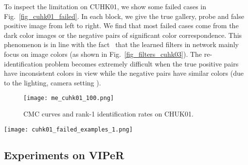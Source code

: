 \documentclass[10pt,twocolumn,letterpaper]{article}
\begin{document}
To inspect the limitation on CUHK01, we show some failed cases in Fig.~\ref{fig_cuhk01_failed}. In each block, we give the true gallery, probe and false positive image from left to right.
We find that most failed cases come from the dark color images or the negative pairs of significant color correspondence.
This phenomenon is in line with the fact~\cite{ahmed2015improved} that the learned filters in network mainly focus on image colors (as shown in Fig.~\ref{fig_filters_cuhk03}).
The re-identification problem becomes extremely difficult when the true positive pairs have inconsistent colors in view while the negative pairs have similar colors (due to the lighting, camera setting \etc).


\begin{figure}[!htb]
  \centering
  \texttt{[image: me\_cuhk01\_100.png]}
  \caption{CMC curves and rank-1 identification rates on CHUK01.}
  \label{fig_cmc_cuhk01}
\end{figure}

\begin{figure*}[!htb]
  \centering
  \texttt{[image: cuhk01\_failed\_examples\_1.png]}
  \caption{Some failed cases on CHUK01 by the proposed method. Left: true gallery. Middle: probe. Right: false positive.}
  \label{fig_cuhk01_failed}
\end{figure*}


\subsection{Experiments on VIPeR}
\label{section_Experiments_on_VIPeR}
\end{document}

